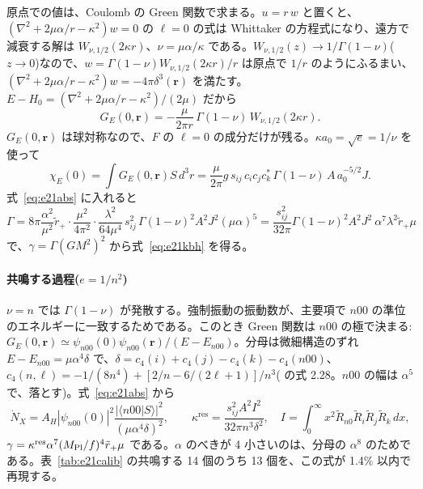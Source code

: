 原点での値は、Coulomb の Green 関数で求まる。$u=r\,w$ と置くと、$(\nabla^2+2\mu\alpha/r-\kappa^2)w=0$ の $\ell=0$ の式は Whittaker の方程式になり、遠方で減衰する解は $W_{\nu,1/2}(2\kappa r)$、$\nu=\mu\alpha/\kappa$ である。$W_{\nu,1/2}(z)\to1/\Gamma(1-\nu)$($z\to0$)なので、$w=\Gamma(1-\nu)W_{\nu,1/2}(2\kappa r)/r$ は原点で $1/r$ のようにふるまい、$(\nabla^2+2\mu\alpha/r-\kappa^2)w=-4\pi\delta^3(\mathbf r)$ を満たす。$E-H_0=(\nabla^2+2\mu\alpha/r-\kappa^2)/(2\mu)$ だから
\begin{equation}
G_E(0,\mathbf r)=-\frac{\mu}{2\pi r}\,\Gamma(1-\nu)\,W_{\nu,1/2}(2\kappa r).
\end{equation}
$G_E(0,\mathbf r)$ は球対称なので、$F$ の $\ell=0$ の成分だけが残る。$\kappa a_0=\sqrt e=1/\nu$ を使って
\begin{equation}
\chi_E(0)=\int G_E(0,\mathbf r)S\,d^3r=\frac{\mu}{2\pi}g\,s_{ij}\,c_ic_jc_k^*\,\Gamma(1-\nu)\,A\,a_0^{-5/2}J.
\end{equation}
式~\eqref{eq:e21abs} に入れると
\begin{equation}
\Gamma=8\pi\frac{\alpha^2}{\mu^2}\tilde r_+\cdot\frac{\mu^2}{4\pi^2}\cdot\frac{\lambda^2}{64\mu^4}\,s_{ij}^2\,\Gamma(1-\nu)^2A^2J^2(\mu\alpha)^5
=\frac{s_{ij}^2}{32\pi}\Gamma(1-\nu)^2A^2J^2\ \alpha^7\lambda^2\tilde r_+\mu
\end{equation}
で、$\gamma=\Gamma(GM^2)^2$ から式~\eqref{eq:e21kbh} を得る。

\paragraph{共鳴する過程($e=1/n^2$)}
$\nu=n$ では $\Gamma(1-\nu)$ が発散する。強制振動の振動数が、主要項で $n00$ の準位のエネルギーに一致するためである。このとき Green 関数は $n00$ の極で決まる: $G_E(0,\mathbf r)\simeq\psi_{n00}(0)\psi_{n00}(\mathbf r)/(E-E_{n00})$。分母は微細構造のずれ $E-E_{n00}=\mu\alpha^4\delta$ で、$\delta=c_4(i)+c_4(j)-c_4(k)-c_4(n00)$、$c_4(n,\ell)=-1/(8n^4)+[2/n-6/(2\ell+1)]/n^3$( の式 2.28。$n00$ の幅は $\alpha^5$ で、落とす)。式~\eqref{eq:e21abs} から
\begin{equation}
\dot N_X=A_H|\psi_{n00}(0)|^2\frac{|\langle n00|S\rangle|^2}{(\mu\alpha^4\delta)^2},\qquad
\kappa^\mathrm{res}=\frac{s_{ij}^2A^2I^2}{32\pi n^3\delta^2},\quad I=\int_0^\infty x^2\tilde R_{n0}\tilde R_i\tilde R_j\tilde R_k\,dx,
\label{eq:e21kres}
\end{equation}
$\gamma=\kappa^\mathrm{res}\alpha^7(M_\mathrm{Pl}/f)^4\tilde r_+\mu$ である。$\alpha$ のべきが 4 小さいのは、分母の $\alpha^8$ のためである。表~\ref{tab:e21calib} の共鳴する 14 個のうち 13 個を、この式が 1.4\% 以内で再現する。

